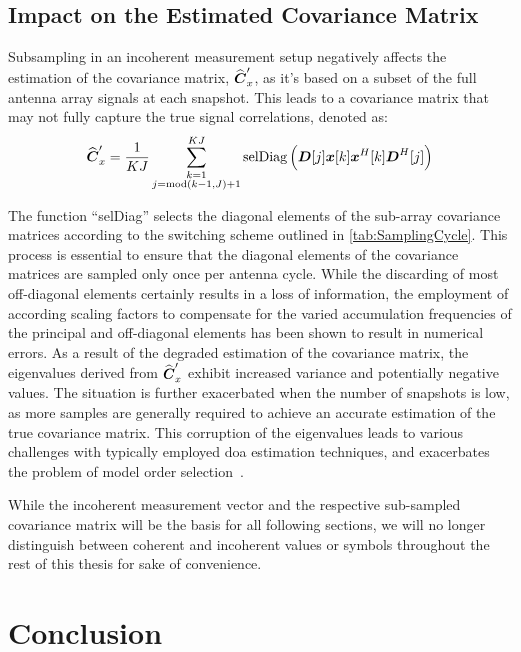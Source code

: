 \subsection{Impact on the Estimated Covariance Matrix}
\label{subsec:ImpactOnTheCovarianceMatrix}
Subsampling in an incoherent measurement setup negatively affects the estimation of the covariance matrix, \( \widehat{\boldsymbol{C}}'_x \), as it's
based on a subset of the full antenna array signals at each snapshot. This leads to a covariance matrix that may not
fully capture the true signal correlations, denoted as:
\begin{equation}
    \widehat{\boldsymbol{C}}'_x = \frac{1}{KJ}\sum_{\substack{k=1 \\ j=\text{mod}(k-1, J) + 1}}^{KJ} \text{selDiag} \left(\boldsymbol{D}[j] \boldsymbol{x}[k] \boldsymbol{x}^H[k] \boldsymbol{D}^H[j] \right)
    \label{eq:sub_sampled_covmat}
\end{equation}

The function ``selDiag'' selects the diagonal elements of the sub-array covariance matrices according to the switching
scheme outlined in \autoref{tab:SamplingCycle}. This process is essential to ensure that the diagonal elements of the
covariance matrices are sampled only once per antenna cycle. While the discarding of most off-diagonal elements certainly
results in a loss of information, the employment of according scaling factors to compensate for the varied accumulation
frequencies of the principal and off-diagonal elements has been shown to result in numerical errors.
As a result of the degraded estimation of the covariance matrix, the eigenvalues derived from \( \widehat{\boldsymbol{C}}'_x \) exhibit
increased variance and potentially negative values.
The situation is further exacerbated when the number of snapshots is low, as more samples are generally required to achieve
an accurate estimation of the true covariance matrix.
This corruption of the eigenvalues leads to various challenges with typically employed \gls{doa} estimation techniques,
and exacerbates the problem of model order selection~\cite[Chapter 6, 8]{meyer}.

While the incoherent measurement vector and the respective sub-sampled covariance matrix will be the basis for all following sections, we will no longer distinguish
between coherent and incoherent values or symbols throughout the rest of this thesis for sake of convenience.


\section{Conclusion}
\label{sec:Conclusion}

